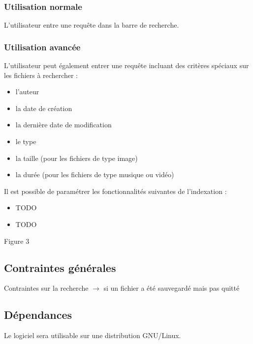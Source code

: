 \documentclass[a4paper,10pt]{article}
\begin{document}
\subsubsection{Utilisation normale}
L'utilisateur entre une requête dans la barre de recherche.

\subsubsection{Utilisation avancée}
L'utilisateur peut également entrer une requête incluant des critères spéciaux
sur les fichiers à rechercher :
\begin{itemize}
 \item l'auteur
 \item la date de création
 \item la dernière date de modification
 \item le type
 \item la taille (pour les fichiers de type image)
 \item la durée (pour les fichiers de type musique ou vidéo)
\end{itemize}
Il est possible de paramétrer les fonctionnalités suivantes de l'indexation :
\begin{itemize}
 \item TODO
 \item TODO
\end{itemize}

Figure 3

\subsection{Contraintes générales}
Contraintes sur la recherche $\rightarrow$ si un fichier a été sauvegardé mais
pas quitté

\subsection{Dépendances}
Le logiciel sera utilisable sur une distribution GNU/Linux.
\end{document}
